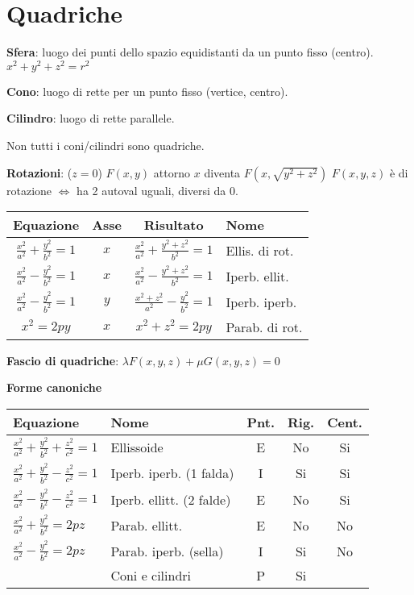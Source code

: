 \section{Quadriche}



\textbf{Sfera}: luogo dei punti dello spazio equidistanti da un punto fisso (centro). $x^2+y^2+z^2=r^2$

\textbf{Cono}: luogo di rette per un punto fisso (vertice, centro).

\textbf{Cilindro}: luogo di rette parallele.

Non tutti i coni/cilindri sono quadriche.

\textbf{Rotazioni}: ($z = 0$) $F(x, y)$ attorno $x$ diventa $F(x, \sqrt{y^2+z^2})$
$F(x,y,z)$ è di rotazione $\Leftrightarrow$ ha 2 autoval uguali, diversi da 0.

\begin{tabular}{cccl}
	\textbf{Equazione} & \textbf{Asse} & \textbf{Risultato} & \textbf{Nome} \\
	\hline
	$\frac{x^2}{a^2}+\frac{y^2}{b^2}=1$ & $x$ & $\frac{x^2}{a^2}+\frac{y^2+z^2}{b^2}=1$ & Ellis. di rot. \\
	$\frac{x^2}{a^2}-\frac{y^2}{b^2}=1$ & $x$ & $\frac{x^2}{a^2}-\frac{y^2+z^2}{b^2}=1$ & Iperb. ellit. \\
	$\frac{x^2}{a^2}-\frac{y^2}{b^2}=1$ & $y$ & $\frac{x^2+z^2}{a^2}-\frac{y^2}{b^2}=1$ & Iperb. iperb. \\
	$x^2=2py$ & $x$ & $x^2+z^2=2py$ & Parab. di rot.
\end{tabular}

\textbf{Fascio di quadriche}: $\lambda F(x, y, z) + \mu G(x, y, z) = 0$

\textbf{Forme canoniche}
\setlength{\tabcolsep}{0.2em}%
\begin{tabular}{llccc}
	\textbf{Equazione} & \textbf{Nome} & \textbf{Pnt.} & \textbf{Rig.} & \textbf{Cent.} \\
	\hline
	$\frac{x^2}{a^2} + \frac{y^2}{b^2} + \frac{z^2}{c^2} = 1$ & Ellissoide & E & No & Si \\
	$\frac{x^2}{a^2} + \frac{y^2}{b^2} - \frac{z^2}{c^2} = 1$ & Iperb. iperb. (1 falda) & I & Si & Si \\
	$\frac{x^2}{a^2} - \frac{y^2}{b^2} - \frac{z^2}{c^2} = 1$ & Iperb. ellitt. (2 falde) & E & No & Si \\
	$\frac{x^2}{a^2} + \frac{y^2}{b^2} = 2pz$ & Parab. ellitt. & E & No & No \\
	$\frac{x^2}{a^2} - \frac{y^2}{b^2} = 2pz$ & Parab. iperb. (sella) & I & Si & No \\
	 & Coni e cilindri & P & Si & \\
\end{tabular}

